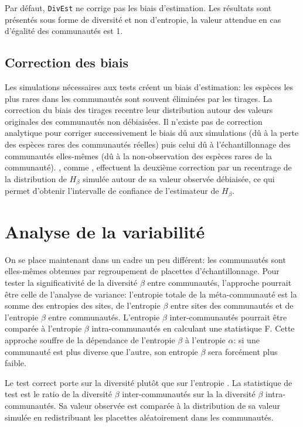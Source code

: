\documentclass[
  11pt,
  french,
  a4paper,
  extrafontsizes,onecolumn,openright
  ]{memoir}
\begin{document}
\normalsize

Par défaut, \texttt{DivEst} ne corrige pas les biais d'estimation.
Les résultats sont présentés sous forme de diversité et non d'entropie, la valeur attendue en cas d'égalité des communautés est 1.

\subsection{Correction des biais}\label{correction-des-biais}

Les simulations nécessaires aux tests créent un biais d'estimation: les espèces les plus rares dans les communautés sont souvent éliminées par les tirages.
La correction du biais des tirages recentre leur distribution autour des valeurs originales des communautés non débiaisées.
Il n'existe pas de correction analytique pour corriger successivement le biais dû aux simulations (dû à la perte des espèces rares des communautés réelles) puis celui dû à l'échantillonnage des communautés elles-mêmes (dû à la non-observation des espèces rares de la communauté).
\textcite{Marcon2012a}, comme \textcite{Chao2015}, effectuent la deuxième correction par un recentrage de la distribution de \(H_{\beta}\) simulée autour de sa valeur observée débiaisée, ce qui permet d'obtenir l'intervalle de confiance de l'estimateur de \(H_{\beta}\).

\section{Analyse de la variabilité}\label{analyse-de-la-variabilituxe9-1}

On se place maintenant dans un cadre un peu différent: les communautés sont elles-mêmes obtenues par regroupement de placettes d'échantillonnage.
Pour tester la significativité de la diversité \(\beta\) entre communautés, l'approche pourrait être celle de l'analyse de variance: l'entropie totale de la méta-communauté est la somme des entropies des sites, de l'entropie \(\beta\) entre sites des communautés et de l'entropie \(\beta\) entre communautés.
L'entropie \(\beta\) inter-communautés pourrait être comparée à l'entropie \(\beta\) intra-communautés en calculant une statistique F.
Cette approche souffre de la dépendance de l'entropie \(\beta\) à l'entropie \(\alpha\): si une communauté est plus diverse que l'autre, son entropie \(\beta\) sera forcément plus faible.

Le test correct porte sur la diversité plutôt que sur l'entropie \autocite{Richard-Hansen2015}.
La statistique de test est le ratio de la diversité \(\beta\) inter-communautés sur la la diversité \(\beta\) intra-communautés.
Sa valeur observée est comparée à la distribution de sa valeur simulée en redistribuant les placettes aléatoirement dans les communautés.
\end{document}

